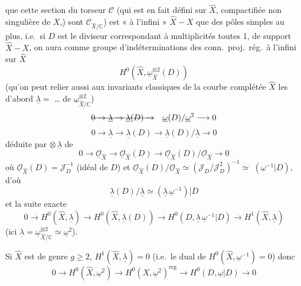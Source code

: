 \documentclass[11pt,a4paper]{article}
\begin{document}
que cette section du torseur $\mathcal{C}$ (qui est en fait défini sur $\hat{X}$, compactifiée non singulière  de $X$,) sont $\mathcal{C}_{\hat{X}/\mathbb{C}}$) est  « à l'infini » $\hat{X} - X$ que des pôles simples au plus, i.e.\ si $D$ est le diviseur correspondant  à multiplicités toutes 1, de support $\hat{X} - X$, on aura comme groupe d'indéterminations des conn.\ proj.\ rég.\ à l'infini sur $\hat{X}$
\[
H^{0}(\hat{X}, \underline{\omega}^{\otimes 2}_{\hat{X}}(D))
\]
(qu'on peut relier aussi aux invariants classiques de la courbe complétée $\hat{X}$ les  \struck{\uncertain{\ill{}}} d'abord $\underline{\lambda} = $  \ldots{}  de $\underline{\omega}^{\otimes 2}_{\hat{X}/\mathbb{C}}$)
\[
\text{\struck{$0 \to \underline{\lambda} \to \underline{\lambda}(D) \to$}} \quad \underline{\omega}(D)/\underline{\omega}^{2} \longrightarrow 0
\]
\[
0 \longrightarrow \underline{\lambda} \longrightarrow \underline{\lambda}(D) \longrightarrow \underline{\lambda}(D)/\underline{\lambda} \longrightarrow 0
\]
déduite par $\otimes\,\underline{\lambda}$ de
\[
0 \longrightarrow \underline{\mathcal{O}}_{\hat{X}} \longrightarrow \underline{\mathcal{O}}_{\hat{X}}(D) \longrightarrow \underline{\mathcal{O}}_{\hat{X}}(D)/\underline{\mathcal{O}}_{\hat{X}} \longrightarrow 0
\]
où $\underline{\mathcal{O}}_{\hat{X}}(D) = \mathcal{J}_D^{-1}$ (idéal de $D$) et $\underline{\mathcal{O}}_{\hat{X}}(D)/\underline{\mathcal{O}}_{\hat{X}} \simeq (\mathcal{J}_D/\mathcal{J}_D^{2})^{-1} \simeq$ \struck{\ill{}} $(\underline{\omega}^{-1}|D)$, d'où
\[
\underline{\lambda}(D)/\underline{\lambda} \simeq (\underline{\lambda}\,\underline{\omega}^{-1})|D
\]
et la suite exacte
\[
0 \to H^{0}(\hat{X}, \underline{\lambda}) \to H^{0}(\hat{X}, \underline{\lambda}(D)) \to H^{0}(D, \underline{\lambda}\,\underline{\omega}^{-1}|D) \to H^{1}(\hat{X}, \underline{\lambda})
\]
(ici $\underline{\lambda} = \underline{\omega}^{\otimes 2}_{\hat{X}/\mathbb{C}} \simeq \underline{\omega}^{2}$).

Si $\hat{X}$ est de genre $g \geqslant 2$, $H^{1}(\hat{X}, \underline{\lambda}) = 0$ (i.e.\ le dual de $H^{0}(\hat{X}, \underline{\omega}^{-1}) = 0$) donc
\[
0 \to H^{0}(\hat{X}, \underline{\omega}^{2}) \to H^{0}(X, \underline{\omega}^{2})^{\mathrm{reg}} \to H^{0}(D, \underline{\omega}|D) \to 0
\]
\end{document}
